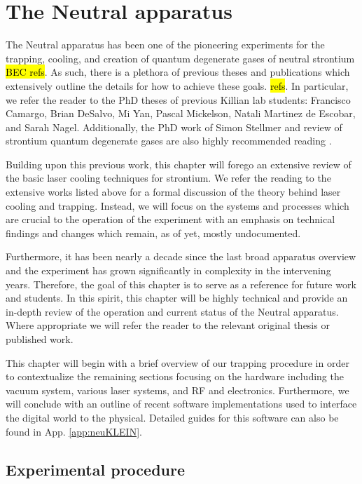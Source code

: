 \chapter{The Neutral apparatus}
\label{ch:chap2}

The Neutral apparatus has been one of the pioneering experiments for the trapping, cooling, and creation of quantum degenerate gases of neutral strontium \hl{BEC refs}. 
As such, there is a plethora of previous theses and publications which extensively outline the details for how to achieve these goals. \hl{refs}. 
In particular, we refer the reader to the PhD theses of previous Killian lab students: Francisco Camargo, Brian DeSalvo, Mi Yan, Pascal Mickelson, Natali Martinez de Escobar, and Sarah Nagel. 
Additionally, the PhD work of Simon Stellmer \cite{SimonStellmer2013} and review of strontium quantum degenerate gases are also highly recommended reading \cite{StellmerRev2013}.

Building upon this previous work, this chapter will forego an extensive review of the basic laser cooling techniques for strontium. 
We refer the reading to the extensive works listed above for a formal discussion of the theory behind laser cooling and trapping.
Instead, we will focus on the systems and processes which are crucial to the operation of the experiment with an emphasis on technical findings and changes which remain, as of yet, mostly undocumented.

Furthermore, it has been nearly a decade since the last broad apparatus overview \cite{MartinezdeEscolar2010} and the experiment has grown significantly in complexity in the intervening years.
Therefore, the goal of this chapter is to serve as a reference for future work and students. 
In this spirit, this chapter will be highly technical and provide an in-depth review of the operation and current status of the Neutral apparatus.
Where appropriate we will refer the reader to the relevant original thesis or published work.

This chapter will begin with a brief overview of our trapping procedure in order to contextualize the remaining sections focusing on the hardware including the vacuum system, various laser systems, and RF and electronics.
Furthermore, we will conclude with an outline of recent software implementations used to interface the digital world to the physical.
Detailed guides for this software can also be found in App. \ref{app:neuKLEIN}.

\section{Experimental procedure} \label{sec:trapping}

